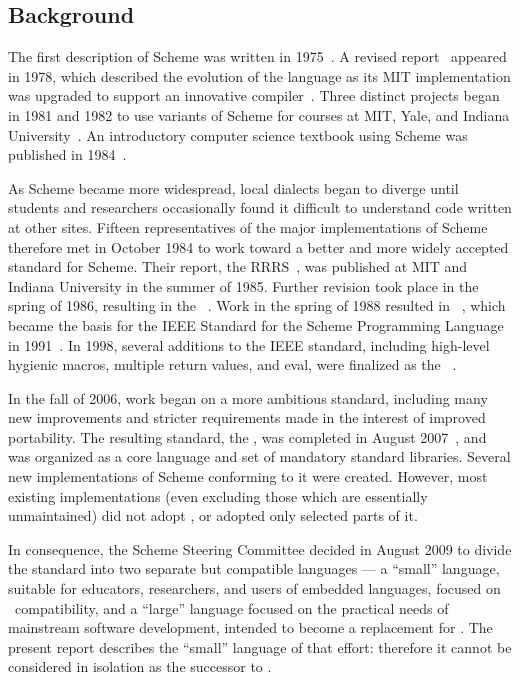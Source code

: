 \subsection*{Background}

\vest The first description of Scheme was written in
1975~\cite{Scheme75}.  A revised report~\cite{Scheme78}
appeared in 1978, which described the evolution
of the language as its MIT implementation was upgraded to support an
innovative compiler~\cite{Rabbit}.  Three distinct projects began in
1981 and 1982 to use variants of Scheme for courses at MIT, Yale, and
Indiana University~\cite{Rees82,MITScheme,Scheme311}.  An introductory
computer science textbook using Scheme was published in
1984~\cite{SICP}.

\vest As Scheme became more widespread,
local dialects began to diverge until students and researchers
occasionally found it difficult to understand code written at other
sites.
Fifteen representatives of the major implementations of Scheme therefore
met in October 1984 to work toward a better and more widely accepted
standard for Scheme.
Their report, the RRRS~\cite{RRRS},
was published at MIT and Indiana University in the summer of 1985.
Further revision took place in the spring of 1986, resulting in the
\rthreers~\cite{R3RS}.
Work in the spring of 1988 resulted in \rfourrs~\cite{R4RS},
which became the basis for the
IEEE Standard for the Scheme Programming Language in 1991~\cite{IEEEScheme}.
In 1998, several additions to the IEEE standard, including high-level
hygienic macros, multiple return values, and {\cf eval}, were finalized
as the \rfivers~\cite{R5RS}.


In the fall of 2006, work began on a more ambitious standard,
including many new improvements and stricter requirements made in the
interest of improved portability.  The resulting standard, the
\rsixrs, was completed in August 2007~\cite{R6RS}, and was organized
as a core language and set of mandatory standard libraries.  
Several new implementations of Scheme conforming to it were created.
However, most existing \rfivers{} implementations (even excluding those
which are essentially unmaintained) did not adopt \rsixrs, or adopted
only selected parts of it.

In consequence, the Scheme Steering Committee decided in August 2009 to divide the
standard into two separate but compatible languages --- a ``small''
language, suitable for educators, researchers, and users of embedded languages,
focused on \rfivers~compatibility, and a ``large'' language focused
on the practical needs of mainstream software development,
intended to become a replacement for \rsixrs.
The present report describes the ``small'' language of that effort:
therefore it cannot be considered in isolation as the successor
to \rsixrs.



